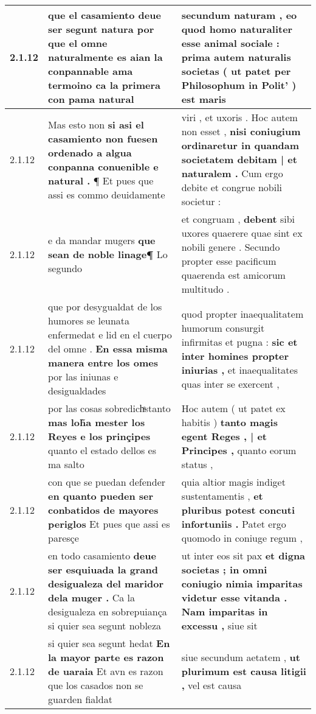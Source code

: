 \begin{tabular}{|p{1cm}|p{6.5cm}|p{6.5cm}|}
2.1.12 & que el casamiento deue ser segunt natura \textbf{ por que el omne naturalmente es aian la conpannable ama termoino } ca la primera con pama natural & secundum naturam , \textbf{ eo quod homo naturaliter esse animal sociale : prima autem naturalis societas ( ut patet per Philosophum in Polit’ ) } est maris \\\hline
2.1.12 & Mas esto non \textbf{ si asi el casamiento non fuesen ordenado a algua conpanna conuenible e natural . } ¶ Et pues que assi es commo deuidamente & viri , et uxoris . Hoc autem non esset , \textbf{ nisi coniugium ordinaretur in quandam societatem debitam | et naturalem . } Cum ergo debite et congrue nobili societur : \\\hline
2.1.12 & e da mandar mugers \textbf{ que sean de noble linage¶ } Lo segundo & et congruam , \textbf{ debent } sibi uxores quaerere quae sint ex nobili genere . Secundo propter esse pacificum quaerenda est amicorum multitudo . \\\hline
2.1.12 & que por desygualdat de los humores se leunata enfermedat e lid en el cuerpo del omne . \textbf{ En essa misma manera entre los omes } por las iniunas e desigualdades & quod propter inaequalitatem humorum consurgit infirmitas et pugna : \textbf{ sic et inter homines propter iniurias , } et inaequalitates quas inter se exercent , \\\hline
2.1.12 & por las cosas sobredichͣstanto \textbf{ mas loh̃a mester los Reyes e los prinçipes } quanto el estado dellos es ma salto & Hoc autem ( ut patet ex habitis ) \textbf{ tanto magis egent Reges , | et Principes , } quanto eorum status , \\\hline
2.1.12 & con que se puedan defender \textbf{ en quanto pueden ser conbatidos de mayores periglos } Et pues que assi es paresçe & quia altior magis indiget sustentamentis , \textbf{ et pluribus potest concuti infortuniis . } Patet ergo quomodo in coniuge regum , \\\hline
2.1.12 & en todo casamiento \textbf{ deue ser esquiuada la grand desigualeza del maridor dela muger . } Ca la desigualeza en sobrepuiança si quier sea segunt nobleza & ut inter eos sit pax \textbf{ et digna societas ; in omni coniugio nimia imparitas videtur esse vitanda . Nam imparitas in excessu , } siue sit \\\hline
2.1.12 & si quier sea segunt hedat \textbf{ En la mayor parte es razon de uaraia } Et avn es razon que los casados non se guarden fialdat & siue secundum aetatem , \textbf{ ut plurimum est causa litigii , } vel est causa \\\hline

\end{tabular}
